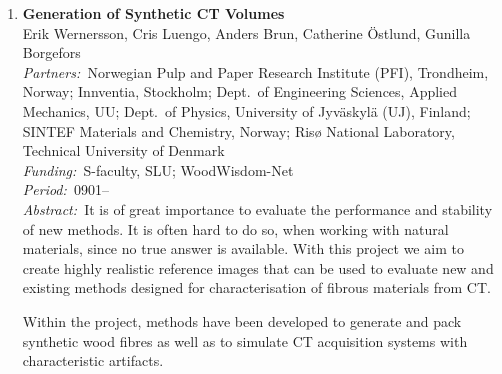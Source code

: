 \documentclass[10pt, a4paper]{article}
\newcommand{\aabstract}[1]{\emph{Abstract:~}#1}
\newcommand{\ffunding}[1]{\emph{Funding:~}#1\\}
\newcommand{\ppartners}[1]{\emph{Partners:~}#1\\}
\newcommand{\pperiod}[1]{\emph{Period:~}#1\\}
\newcommand{\uu}{UU}
\begin{document}
\begin{enumerate}
{In this project, different volume images of paper and composite materials are available: one volume created from a series of 2D scanning electron microscopy (SEM) images at StoraEnso, Falun; and X-ray microtomography volume images of paper and composite samples imaged at the European Synchrotron Radiation Facility (ESRF) in Grenoble, France, at the Paul Scherrer Institut (PSI) in Villigen, Switzerland and also from tabletop scanners at University of Jyv\"askyl\"a, Finland, UU, and Innventia, Stockholm.}


\item \label{proj:woodSynth}
\textbf{Generation of Synthetic \textmu CT Volumes}\\ %
Erik Wernersson, Cris Luengo, Anders Brun, Catherine \"{O}stlund, Gunilla Borgefors \\
\ppartners{Norwegian Pulp and Paper Research Institute (PFI), Trondheim, Norway; Innventia, Stockholm; Dept.~of Engineering Sciences, Applied Mechanics, \uu; Dept.~of Physics, University of Jyv\"{a}skyl\"{a} (UJ), Finland; SINTEF Materials and Chemistry, Norway; Ris{\o} National Laboratory, Technical University of Denmark}
\ffunding{S-faculty, SLU; WoodWisdom-Net}
\pperiod{0901--}
\newpage
\aabstract{It is of great importance to evaluate the performance and stability of new methods. It is often hard to do so, when working with natural materials, since no true answer is available. With this project we aim to create highly realistic reference images that can be used to
evaluate new and existing methods designed for characterisation of fibrous materials from \textmu CT.

Within the project, methods have been developed to generate and pack synthetic wood fibres as well as to simulate \textmu CT acquisition
systems with characteristic artifacts.}



\end{enumerate}
\end{document}
